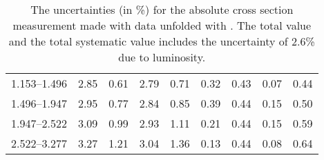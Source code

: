 \begin{table}
\begin{center}
\begin{tabular}{@{}l l l l l l l l l@{}}
            1.153--1.496    &  2.85   &  0.61   &  2.79         &  0.71      &  0.32    &  0.43  &  0.07       &  0.44  \\
            1.496--1.947    &  2.95   &  0.77   &  2.84         &  0.85      &  0.39    &  0.44  &  0.15       &  0.50  \\
            1.947--2.522    &  3.09   &  0.99   &  2.93         &  1.11      &  0.21    &  0.44  &  0.15       &  0.59  \\
            2.522--3.277    &  3.27   &  1.21   &  3.04         &  1.36      &  0.13    &  0.44  &  0.08       &  0.64  \\
            \bottomrule
        \end{tabular}
    \end{center}
    \caption[
        The uncertainties for the absolute cross section measurement made with
        data unfolded with \MADGRAPH.
    ]{
        The uncertainties (in \%) for the absolute cross section measurement
        made with data unfolded with \MADGRAPH. The total value and the total
        systematic value includes the uncertainty of 2.6\% due to luminosity.
    }
    \label{tab:sys_uncert_abs}
\end{table}
